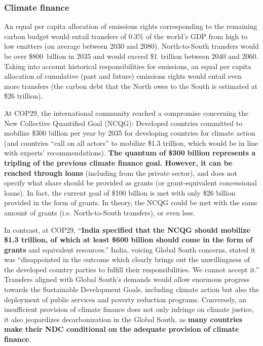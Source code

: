 \documentclass[12pt,english]{article}
\begin{document}
\subsubsection{Climate finance\label{subsubsec:finance}}

An equal per capita allocation of emissions rights corresponding to the remaining carbon budget would entail transfers of 0.3\% of the world's GDP from high to low emitters (on average between 2030 and 2080). North-to-South transfers would be over \$800~billion in 2035 and would exceed \$1~trillion between 2040 and 2060. 
Taking into account historical responsibilities for emissions, an equal per capita allocation of cumulative (past and future) emissions rights would entail even more transfers (the carbon debt that the North owes to the South is estimated at \$26 trillion\cite{fabre_global_2024,fanning_compensation_2023}). 

At COP29, the international community reached a compromise concerning the New Collective Quantified Goal (NCQG): Developed countries committed to mobilize \$300 billion per year by 2035 for developing countries for climate action (and countries ``call on all actors'' to mobilize \$1.3 trillion, which would be in line with experts' recommendations\cite{unfccc_new_2024,songwe_raising_2024}). \textbf{The quantum of \$300 billion represents a tripling of the previous climate finance goal. However, it can be reached through loans} (including from the private sector), and does not specify what share should be provided as grants (or grant-equivalent concessional loans). In fact, the current goal of \$100 billion is met with only \$26 billion provided in the form of grants.\cite{oecd_climate_2024} 
In theory, the NCQG could be met with the same amount of grants (i.e. North-to-South transfers), or even less. 

In contrast, at COP29, ``\textbf{India specified that the NCQG should mobilize \$1.3 trillion, of which at least \$600 billion should come in the form of grants} and equivalent resources.''\cite{earth_negotiations_bulletin_daily_2024} India, voicing Global South concerns, stated it was ``disappointed in the outcome which clearly brings out the unwillingness of the developed country parties to fulfill their responsibilities. We cannot accept it.'' Transfers aligned with Global South's demands would allow enormous progress towards the Sustainable Development Goals, including climate action but also the deployment of public services and poverty reduction programs. Conversely, an insufficient provision of climate finance does not only infringe on climate justice, it also jeopardizes decarbonization in the Global South, as \textbf{many countries make their NDC conditional on the adequate provision of climate finance}. 
\end{document}
